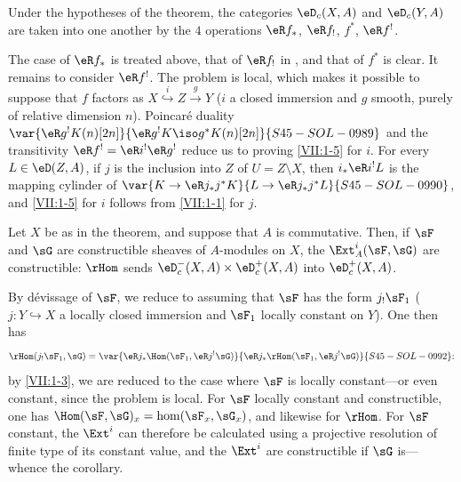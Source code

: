 \begin{corollary_}\label{VII:1-5}
Under the hypotheses of the theorem, the categories $\eD_c(X,A)$ and
$\eD_c(Y,A)$ are taken into one another by the $4$ operations
$\eR f_\ast$, $\eR f_!$, $f^\ast$, $\eR f^!$.
\end{corollary_}

The case of $\eR f_\ast$ is treated above, that of $\eR f_!$ in
\cite[XVII 5.3]{sga4}, and that of $f^\ast$ is clear. It remains to consider
$\eR f^!$. The problem is local, which makes it possible to suppose that $f$
factors as $X\overset{i}{\hookrightarrow} Z \xrightarrow g Y$ ($i$ a closed immersion and
$g$ smooth, purely of relative dimension $n$). Poincaré duality
$\var{\eR g^! K(n)[2 n]}{\eR g^! K \iso g^\ast K(n)[2 n]}{S45-SOL-0989}$ and the transitivity
$\eR f^! = \eR i^! \eR g^!$ reduce us to proving \ref{VII:1-5} for $i$.
For every $L\in \eD(Z,A)$, if $j$ is the inclusion into $Z$ of
$U=Z\setminus X$, then $i_\ast \eR i^! L$ is the mapping cylinder of
$\var{K\to \eR j_\ast j^\ast K}{L\to \eR j_\ast j^\ast L}{S45-SOL-0990}$, and \ref{VII:1-5} for $i$ follows from
\ref{VII:1-1} for $j$.






\begin{corollary_}\label{VII:1-6}
Let $X$ be as in the theorem, and suppose that $A$ is commutative. Then, if
$\sF$ and $\sG$ are constructible sheaves of $A$-modules on $X$, the
$\Ext_A^i(\sF,\sG)$ are constructible: $\rHom$ sends
$\eD_c^-(X,A)\times \eD_c^+(X,A)$ into $\eD_c^+(X,A)$.
\end{corollary_}

By dévissage of $\sF$, we reduce to assuming that $\sF$ has the form
$j_!\sF_1$ ($j:Y\hookrightarrow X$ a locally closed immersion and $\sF_1$
locally constant on $Y$). One then has
\[
  \rHom(j_! \sF_1,\sG) = \var{\eR j_\ast \Hom(\sF_1,\eR j^! \sG)}{\eR j_\ast \rHom(\sF_1,\eR j^! \sG)}{S45-SOL-0992} \text{:}
\]
by \ref{VII:1-3}, we are reduced to the case where $\sF$ is locally
constant---or even constant, since the problem is local. For $\sF$ locally
constant and constructible, one has
$\Hom(\sF,\sG)_x=\hom(\sF_x,\sG_x)$, and likewise for $\rHom$. For $\sF$
constant, the $\Ext^i$ can therefore be calculated using a projective
resolution of finite type of its constant value, and the $\Ext^i$ are
constructible if $\sG$ is---whence the corollary.






